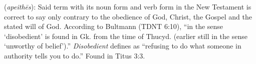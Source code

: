 \item[Disobedient,]

(\textit{apeithēs}):
Said term with its noun form  and verb form  in the New Testament is correct to say only contrary to the obedience of God, Christ, the Gospel and the stated will of God. According to Bultmann (TDNT 6:10), ``in the sense `disobedient' is found in Gk. from the time of Thucyd. (earlier still in the sense `unworthy of belief').'' \emph{Disobedient} defines as ``refusing to do what someone in authority tells you to do.''
Found in Titus 3:3.
